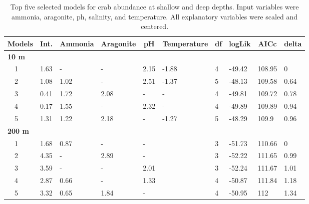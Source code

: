 \documentclass[letterpaper,12pt]{article}\usepackage[]{graphicx}\usepackage[]{color}
\begin{document}
\begin{table}[!tbp]
{\footnotesize
\caption{Top five selected models for crab abundance at shallow and deep depths. Input variables were ammonia, aragonite, ph, salinity, and temperature. All explanatory variables were scaled and centered.\label{tab:abutab}} 
\begin{center}
\begin{tabular}{llllllllll}
\hline\hline
\multicolumn{1}{l}{Models}&\multicolumn{1}{c}{Int.}&\multicolumn{1}{c}{Ammonia}&\multicolumn{1}{c}{Aragonite}&\multicolumn{1}{c}{pH}&\multicolumn{1}{c}{Temperature}&\multicolumn{1}{c}{df}&\multicolumn{1}{c}{logLik}&\multicolumn{1}{c}{AICc}&\multicolumn{1}{c}{delta}\tabularnewline
\hline
{\bfseries 10 m}&&&&&&&&&\tabularnewline
~~1&1.63&-&-&2.15&-1.88&4&-49.42&108.95&0\tabularnewline
~~2&1.08&1.02&-&2.51&-1.37&5&-48.13&109.58&0.64\tabularnewline
~~3&0.41&1.72&2.08&-&-&4&-49.81&109.72&0.78\tabularnewline
~~4&0.17&1.55&-&2.32&-&4&-49.89&109.89&0.94\tabularnewline
~~5&1.31&1.22&2.18&-&-1.27&5&-48.29&109.9&0.96\tabularnewline
\hline
{\bfseries 200 m}&&&&&&&&&\tabularnewline
~~1&1.68&0.87&-&-&&3&-51.73&110.66&0\tabularnewline
~~2&4.35&-&2.89&-&&3&-52.22&111.65&0.99\tabularnewline
~~3&3.59&-&-&2.01&&3&-52.24&111.67&1.01\tabularnewline
~~4&2.87&0.66&-&1.33&&4&-50.87&111.84&1.18\tabularnewline
~~5&3.32&0.65&1.84&-&&4&-50.95&112&1.34\tabularnewline
\hline
\end{tabular}\end{center}}
\end{table}
\end{document}
